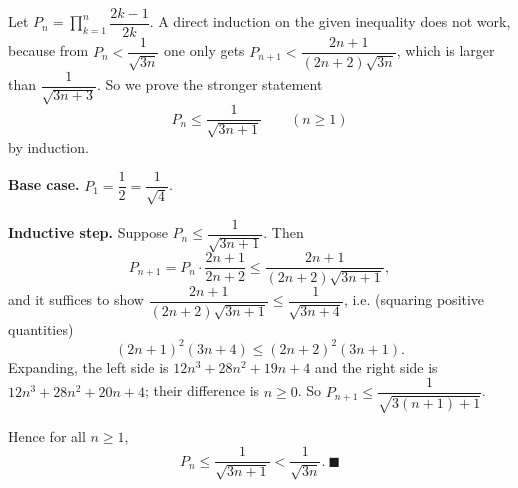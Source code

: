 Let $P_n=\prod_{k=1}^{n}\dfrac{2k-1}{2k}$. A direct induction on the given inequality does not work, because from $P_n<\dfrac1{\sqrt{3n}}$ one only gets $P_{n+1}<\dfrac{2n+1}{(2n+2)\sqrt{3n}}$, which is larger than $\dfrac1{\sqrt{3n+3}}$. So we prove the stronger statement
\[P_n\le\dfrac{1}{\sqrt{3n+1}}\qquad(n\ge1)\]
by induction.

\textbf{Base case.} $P_1=\dfrac12=\dfrac1{\sqrt4}$.

\textbf{Inductive step.} Suppose $P_n\le\dfrac1{\sqrt{3n+1}}$. Then
\[P_{n+1}=P_n\cdot\dfrac{2n+1}{2n+2}\le\dfrac{2n+1}{(2n+2)\sqrt{3n+1}},\]
and it suffices to show $\dfrac{2n+1}{(2n+2)\sqrt{3n+1}}\le\dfrac{1}{\sqrt{3n+4}}$, i.e. (squaring positive quantities)
\[(2n+1)^2(3n+4)\le(2n+2)^2(3n+1).\]
Expanding, the left side is $12n^3+28n^2+19n+4$ and the right side is $12n^3+28n^2+20n+4$; their difference is $n\ge0$. So $P_{n+1}\le\dfrac1{\sqrt{3(n+1)+1}}$.

Hence for all $n\ge1$,
\[P_n\le\dfrac{1}{\sqrt{3n+1}}<\dfrac{1}{\sqrt{3n}}.\ \blacksquare\]
